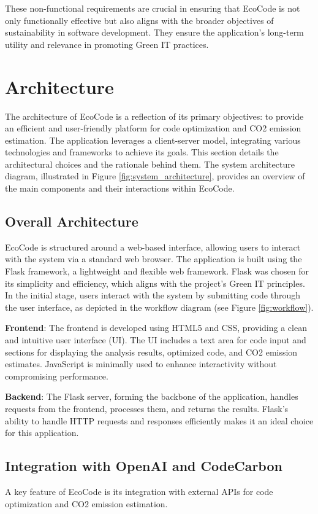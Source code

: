 \documentclass[conference,compsoc]{IEEEtran}
\begin{document}
These non-functional requirements are crucial in ensuring that EcoCode is not only functionally effective but also aligns with the broader objectives of sustainability in software development. They ensure the application's long-term utility and relevance in promoting Green IT practices.

\section{Architecture}
The architecture of EcoCode is a reflection of its primary objectives: to provide an efficient and user-friendly platform for  code optimization and CO2 emission estimation. The application leverages a client-server model, integrating various technologies and frameworks to achieve its goals. This section details the architectural choices and the rationale behind them. The system architecture diagram, illustrated in Figure \ref{fig:system_architecture}, provides an overview of the main components and their interactions within EcoCode.

\subsection{Overall Architecture}
EcoCode is structured around a web-based interface, allowing users to interact with the system via a standard web browser. The application is built using the Flask framework, a lightweight and flexible  web framework. Flask was chosen for its simplicity and efficiency, which aligns with the project's Green IT principles.
In the initial stage, users interact with the system by submitting code through the user interface, as depicted in the workflow diagram (see Figure \ref{fig:workflow}).

\textbf{Frontend}: The frontend is developed using HTML5 and CSS, providing a clean and intuitive user interface (UI). The UI includes a text area for code input and sections for displaying the analysis results, optimized code, and CO2 emission estimates. JavaScript is minimally used to enhance interactivity without compromising performance.

\textbf{Backend}: The Flask server, forming the backbone of the application, handles requests from the frontend, processes them, and returns the results. Flask's ability to handle HTTP requests and responses efficiently makes it an ideal choice for this application.

\subsection{Integration with OpenAI and CodeCarbon}
A key feature of EcoCode is its integration with external APIs for code optimization and CO2 emission estimation.
\end{document}
